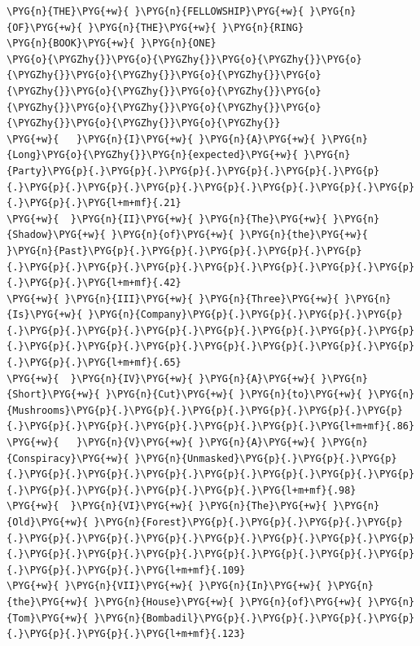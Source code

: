 \begin{codeblockbg}
\begin{Verbatim}[commandchars=\\\{\},breaklines=true,breakanywhere=true,fontsize=\codefont,xleftmargin=17bp]
\PYG{n}{THE}\PYG{+w}{ }\PYG{n}{FELLOWSHIP}\PYG{+w}{ }\PYG{n}{OF}\PYG{+w}{ }\PYG{n}{THE}\PYG{+w}{ }\PYG{n}{RING}
\PYG{n}{BOOK}\PYG{+w}{ }\PYG{n}{ONE}
\PYG{o}{\PYGZhy{}}\PYG{o}{\PYGZhy{}}\PYG{o}{\PYGZhy{}}\PYG{o}{\PYGZhy{}}\PYG{o}{\PYGZhy{}}\PYG{o}{\PYGZhy{}}\PYG{o}{\PYGZhy{}}\PYG{o}{\PYGZhy{}}\PYG{o}{\PYGZhy{}}\PYG{o}{\PYGZhy{}}\PYG{o}{\PYGZhy{}}\PYG{o}{\PYGZhy{}}\PYG{o}{\PYGZhy{}}\PYG{o}{\PYGZhy{}}\PYG{o}{\PYGZhy{}}
\PYG{+w}{   }\PYG{n}{I}\PYG{+w}{ }\PYG{n}{A}\PYG{+w}{ }\PYG{n}{Long}\PYG{o}{\PYGZhy{}}\PYG{n}{expected}\PYG{+w}{ }\PYG{n}{Party}\PYG{p}{.}\PYG{p}{.}\PYG{p}{.}\PYG{p}{.}\PYG{p}{.}\PYG{p}{.}\PYG{p}{.}\PYG{p}{.}\PYG{p}{.}\PYG{p}{.}\PYG{p}{.}\PYG{p}{.}\PYG{p}{.}\PYG{p}{.}\PYG{l+m+mf}{.21}
\PYG{+w}{  }\PYG{n}{II}\PYG{+w}{ }\PYG{n}{The}\PYG{+w}{ }\PYG{n}{Shadow}\PYG{+w}{ }\PYG{n}{of}\PYG{+w}{ }\PYG{n}{the}\PYG{+w}{ }\PYG{n}{Past}\PYG{p}{.}\PYG{p}{.}\PYG{p}{.}\PYG{p}{.}\PYG{p}{.}\PYG{p}{.}\PYG{p}{.}\PYG{p}{.}\PYG{p}{.}\PYG{p}{.}\PYG{p}{.}\PYG{p}{.}\PYG{p}{.}\PYG{l+m+mf}{.42}
\PYG{+w}{ }\PYG{n}{III}\PYG{+w}{ }\PYG{n}{Three}\PYG{+w}{ }\PYG{n}{Is}\PYG{+w}{ }\PYG{n}{Company}\PYG{p}{.}\PYG{p}{.}\PYG{p}{.}\PYG{p}{.}\PYG{p}{.}\PYG{p}{.}\PYG{p}{.}\PYG{p}{.}\PYG{p}{.}\PYG{p}{.}\PYG{p}{.}\PYG{p}{.}\PYG{p}{.}\PYG{p}{.}\PYG{p}{.}\PYG{p}{.}\PYG{p}{.}\PYG{p}{.}\PYG{p}{.}\PYG{l+m+mf}{.65}
\PYG{+w}{  }\PYG{n}{IV}\PYG{+w}{ }\PYG{n}{A}\PYG{+w}{ }\PYG{n}{Short}\PYG{+w}{ }\PYG{n}{Cut}\PYG{+w}{ }\PYG{n}{to}\PYG{+w}{ }\PYG{n}{Mushrooms}\PYG{p}{.}\PYG{p}{.}\PYG{p}{.}\PYG{p}{.}\PYG{p}{.}\PYG{p}{.}\PYG{p}{.}\PYG{p}{.}\PYG{p}{.}\PYG{p}{.}\PYG{p}{.}\PYG{l+m+mf}{.86}
\PYG{+w}{   }\PYG{n}{V}\PYG{+w}{ }\PYG{n}{A}\PYG{+w}{ }\PYG{n}{Conspiracy}\PYG{+w}{ }\PYG{n}{Unmasked}\PYG{p}{.}\PYG{p}{.}\PYG{p}{.}\PYG{p}{.}\PYG{p}{.}\PYG{p}{.}\PYG{p}{.}\PYG{p}{.}\PYG{p}{.}\PYG{p}{.}\PYG{p}{.}\PYG{p}{.}\PYG{p}{.}\PYG{p}{.}\PYG{l+m+mf}{.98}
\PYG{+w}{  }\PYG{n}{VI}\PYG{+w}{ }\PYG{n}{The}\PYG{+w}{ }\PYG{n}{Old}\PYG{+w}{ }\PYG{n}{Forest}\PYG{p}{.}\PYG{p}{.}\PYG{p}{.}\PYG{p}{.}\PYG{p}{.}\PYG{p}{.}\PYG{p}{.}\PYG{p}{.}\PYG{p}{.}\PYG{p}{.}\PYG{p}{.}\PYG{p}{.}\PYG{p}{.}\PYG{p}{.}\PYG{p}{.}\PYG{p}{.}\PYG{p}{.}\PYG{p}{.}\PYG{p}{.}\PYG{p}{.}\PYG{l+m+mf}{.109}
\PYG{+w}{ }\PYG{n}{VII}\PYG{+w}{ }\PYG{n}{In}\PYG{+w}{ }\PYG{n}{the}\PYG{+w}{ }\PYG{n}{House}\PYG{+w}{ }\PYG{n}{of}\PYG{+w}{ }\PYG{n}{Tom}\PYG{+w}{ }\PYG{n}{Bombadil}\PYG{p}{.}\PYG{p}{.}\PYG{p}{.}\PYG{p}{.}\PYG{p}{.}\PYG{p}{.}\PYG{l+m+mf}{.123}

\end{Verbatim}
\end{codeblockbg}
